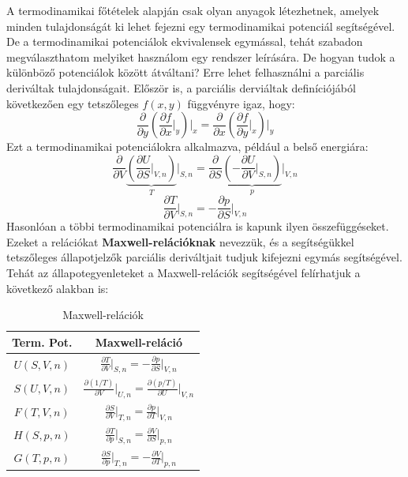 \documentclass[../main.tex]{subfiles}
\begin{document}
A termodinamikai főtételek alapján csak olyan anyagok létezhetnek, amelyek minden tulajdonságát ki lehet fejezni egy termodinamikai potenciál segítségével. De a termodinamikai potenciálok
ekvivalensek egymással, tehát szabadon megválaszthatom melyiket használom egy rendszer leírására.
\newline
\newline
De hogyan tudok a különböző potenciálok között átváltani? Erre lehet felhasználni a parciális deriváltak tulajdonságait.
Először is, a parciális derviáltak definíciójából következően egy tetszőleges $f(x,y)$ függvényre igaz, hogy:
\begin{equation}
    \frac{\partial}{\partial y} \left(\frac{\partial f}{\partial x}\bigg|_y\right)\bigg|_x = \frac{\partial}{\partial x} \left(\frac{\partial f}{\partial y}\bigg|_x\right)\bigg|_y
\end{equation}
Ezt a termodinamikai potenciálokra alkalmazva, például a belső energiára:
\begin{equation}
    \frac{\partial}{\partial V} \underbrace{\left(\frac{\partial U}{\partial S}\bigg|_{V,n}\right)}_{T}\bigg|_{S,n} = \frac{\partial}{\partial S} \underbrace{\left(-\frac{\partial U}{\partial V}\bigg|_{S,n}\right)}_{p}\bigg|_{V,n}
\end{equation}
\begin{equation}
    \frac{\partial T}{\partial V}\bigg|_{S,n} = - \frac{\partial p}{\partial S}\bigg|_{V,n}
\end{equation}
Hasonlóan a többi termodinamikai potenciálra is kapunk ilyen összefüggéseket. Ezeket a relációkat \textbf{Maxwell-relációknak} nevezzük, és
a segítségükkel tetszőleges állapotjelzők parciális deriváltjait tudjuk kifejezni egymás segítségével. Tehát az állapotegyenleteket a Maxwell-relációk segítségével
felírhatjuk a következő alakban is:
\begin{table}[H]
    \centering
    \begin{tabular}{|c|c|}
        \hline
        Term. Pot. & Maxwell-reláció \\
        \hline
        $U(S, V, n)$ & $\frac{\partial T}{\partial V}\big|_{S,n} = - \frac{\partial p}{\partial S}\big|_{V,n}$ \\
        \hline
        $S(U, V, n)$ & $\frac{\partial (1/T)}{\partial V}\big|_{U,n} = \frac{\partial (p/T)}{\partial U}\big|_{V,n}$ \\
        \hline
        $F(T, V, n)$ & $\frac{\partial S}{\partial V}\big|_{T,n} = \frac{\partial p}{\partial T}\big|_{V,n}$ \\
        \hline
        $H(S, p, n)$ & $\frac{\partial T}{\partial p}\big|_{S,n} = \frac{\partial V}{\partial S}\big|_{p,n}$ \\
        \hline
        $G(T, p, n)$ & $\frac{\partial S}{\partial p}\big|_{T,n} = - \frac{\partial V}{\partial T}\big|_{p,n}$ \\
        \hline
    \end{tabular}
    \caption{Maxwell-relációk}
\end{table}
\end{document}
